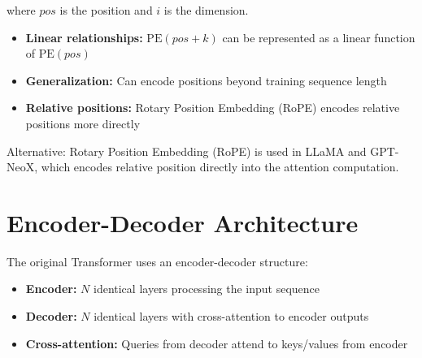 where $pos$ is the position and $i$ is the dimension.

\begin{properties}
\begin{itemize}
    \item \textbf{Linear relationships:} $\text{PE}(pos+k)$ can be represented as a linear function of $\text{PE}(pos)$
    \item \textbf{Generalization:} Can encode positions beyond training sequence length
    \item \textbf{Relative positions:} Rotary Position Embedding (RoPE) encodes relative positions more directly
\end{itemize}
\end{properties}

Alternative: Rotary Position Embedding (RoPE) \cite{su2021roformer} is used in LLaMA and GPT-NeoX, which encodes relative position directly into the attention computation.

\section{Encoder-Decoder Architecture}

The original Transformer uses an encoder-decoder structure:

\begin{itemize}
    \item \textbf{Encoder:} $N$ identical layers processing the input sequence
    \item \textbf{Decoder:} $N$ identical layers with cross-attention to encoder outputs
    \item \textbf{Cross-attention:} Queries from decoder attend to keys/values from encoder
\end{itemize}

